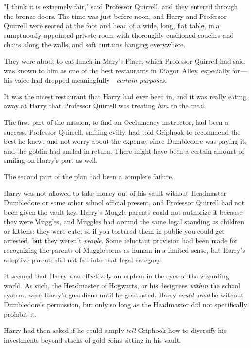"I think it is extremely fair," said Professor Quirrell, and they entered 
through the bronze doors.
\sbreak
The time was just before noon, and Harry and Professor Quirrell were seated at 
the foot and head of a wide, long, flat table, in a sumptuously appointed 
private room with thoroughly cushioned couches and chairs along the walls, and 
soft curtains hanging everywhere.

They were about to eat lunch in Mary's Place, which Professor Quirrell had said 
was known to him as one of the best restaurants in Diagon Alley, especially 
for---his voice had dropped meaningfully---\emph{certain purposes.}

It was the nicest restaurant that Harry had ever been in, and it was really 
eating away at Harry that Professor Quirrell was treating \emph{him} to the 
meal.

The first part of the mission, to find an Occlumency instructor, had been a 
success. Professor Quirrell, smiling evilly, had told Griphook to recommend the 
best he knew, and not worry about the expense, since Dumbledore was paying it; 
and the goblin had smiled in return. There might have been a certain amount of 
smiling on Harry's part as well.

The second part of the plan had been a complete failure.

Harry was not allowed to take money out of his vault without Headmaster 
Dumbledore or some other school official present, and Professor Quirrell had 
not been given the vault key. Harry's Muggle parents could not authorize it 
because they were Muggles, and Muggles had around the same legal standing as 
children or kittens: they were cute, so if you tortured them in public you 
could get arrested, but they weren't \emph{people}. Some reluctant provision 
had been made for recognizing the parents of Muggleborns as human in a limited 
sense, but Harry's adoptive parents did not fall into that legal category.

It seemed that Harry was effectively an orphan in the eyes of the wizarding 
world. As such, the Headmaster of Hogwarts, or his designees \emph{within} the 
school system, were Harry's guardians until he graduated. Harry \emph{could} 
breathe without Dumbledore's permission, but only so long as the Headmaster did 
not specifically prohibit it.

Harry had then asked if he could simply \emph{tell} Griphook how to diversify 
his investments beyond stacks of gold coins sitting in his vault.

